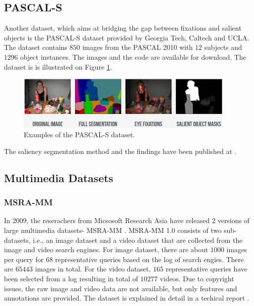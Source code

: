 \subsection{PASCAL-S}
Another dataset, which aims at bridging the gap between fixations and salient objects is the PASCAL-S dataset \cite{pascal-s_db} provided by Georgia Tech, Caltech and UCLA. The dataset contains $850$ images from the PASCAL 2010 with $12$ subjects and $1296$ object instances. The images and the code are available for download. The dataset is is illustrated on Figure \ref{fig:pascal-s}.

\begin{figure}[H]
\begin{center}
\includegraphics[width=0.95\textwidth]{fig/PASCAL-S}
\end{center}
\caption{Examples of the PASCAL-S dataset.}
\label{fig:pascal-s}
\end{figure}


The saliency segmentation method and the findings have been published at \cite{TPAMI.2012.147}.  

\subsection{Multimedia Datasets}
\subsubsection{MSRA-MM}
In 2009, the reserachers from Micsosoft Research Asia have released 2 versions of large multimedia datasets- MSRA-MM \cite{msra-mm_db}. MSRA-MM 1.0 consists of two sub-datasets, i.e., an image dataset and a video dataset that are collected from the image and video search engines. For image dataset, there are about $1000$ images per query for $68$ representative queries based on the log of search engies. There are $65443$ images in total. For the video dataset, $165$ representative queries have been selected from a log resulting in total of $10277$ videos. Due to copyright issues, the raw image and video data are not available, but only features and annotations are provided. The dataset is explained in detail in a techical report \cite{export:79942}.